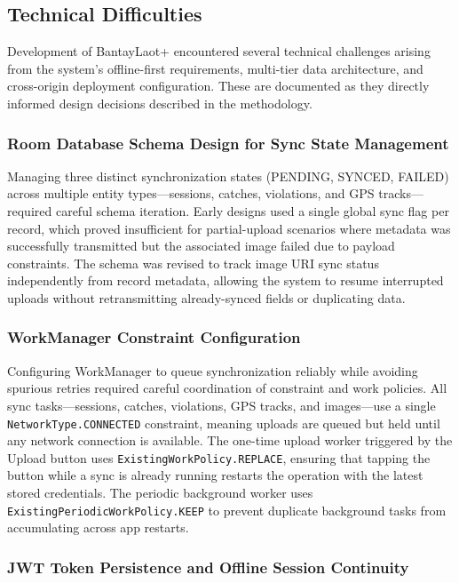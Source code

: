 \documentclass[journal]{IEEEtran}
\begin{document}
\subsection{Technical Difficulties}

Development of BantayLaot+ encountered several technical challenges arising from the
system's offline-first requirements, multi-tier data architecture, and cross-origin
deployment configuration. These are documented as they directly informed design decisions
described in the methodology.

\subsubsection{Room Database Schema Design for Sync State Management}

Managing three distinct synchronization states (PENDING, SYNCED, FAILED) across multiple
entity types---sessions, catches, violations, and GPS tracks---required careful schema
iteration. Early designs used a single global sync flag per record, which proved
insufficient for partial-upload scenarios where metadata was successfully transmitted but
the associated image failed due to payload constraints. The schema was revised to track
image URI sync status independently from record metadata, allowing the system to resume
interrupted uploads without retransmitting already-synced fields or duplicating data.

\subsubsection{WorkManager Constraint Configuration}

Configuring WorkManager to queue synchronization reliably while avoiding spurious retries
required careful coordination of constraint and work policies. All sync tasks---sessions,
catches, violations, GPS tracks, and images---use a single \texttt{NetworkType.CONNECTED}
constraint, meaning uploads are queued but held until any network connection is available.
The one-time upload worker triggered by the Upload button uses
\texttt{ExistingWorkPolicy.REPLACE}, ensuring that tapping the button while a sync is
already running restarts the operation with the latest stored credentials. The periodic
background worker uses \texttt{ExistingPeriodicWorkPolicy.KEEP} to prevent duplicate
background tasks from accumulating across app restarts.

\subsubsection{JWT Token Persistence and Offline Session Continuity}
\end{document}
